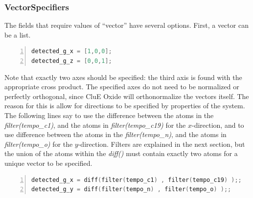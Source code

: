 \documentclass{book}
\begin{document}
\subsubsection{VectorSpecifiers} %
The fields that require values of ``vector'' have several options.
First, a vector can be a list.
\begin{lstlisting}[frame=single,numbers=left,language=c]
detected_g_x = [1,0,0];
detected_g_z = [0,0,1];
\end{lstlisting}
Note that exactly two axes should be specified: 
the third axis is found with the appropriate cross product.  
The specified axes do not need to be normalized or perfectly orthogonal, 
since CluE Oxide will orthonormalize the vectors itself.  
The reason for this is allow for directions to be specified by properties of
the system.    
The following lines say to use the difference between the atoms in the
\textit{filter(tempo\_c1)}, and the atoms in \textit{filter(tempo\_c19)} 
for the $x$-direction,
and to use difference between the atoms in the
\textit{filter(tempo\_n)}, and the atoms in \textit{filter(tempo\_o)} 
for the $y$-direction.
Filters are explained in the next section, but the union of the atoms within
the \textit{diff()} must contain exactly two atoms for a unique vector to
be specified.
\begin{lstlisting}[frame=single,numbers=left,language=c]
detected_g_x = diff(filter(tempo_c1) , filter(tempo_c19) );;
detected_g_y = diff(filter(tempo_n) , filter(tempo_o) );;
\end{lstlisting}
\end{document}
